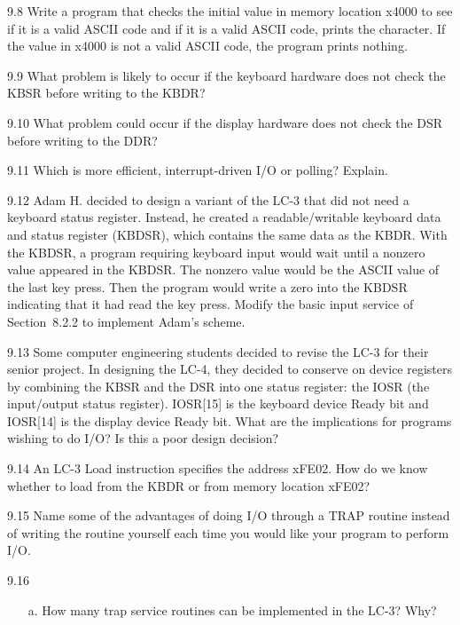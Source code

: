 \documentclass{patt}
\begin{document}
\begin{exercises}
\item[9.8] Write a program that checks the initial value in memory
  location x4000 to see if it is a valid ASCII code and if it is a
  valid ASCII code, prints the character. If the value in x4000 is not
  a valid ASCII code, the program prints nothing.

\item[9.9] What problem is likely to occur if the keyboard hardware
  does not check the KBSR before writing to the KBDR?

\item[9.10] What problem could occur if the display hardware does not
  check the DSR before writing to the DDR?

\item[9.11] Which is more efficient, interrupt-driven I/O or polling?
  Explain.

\item[9.12] Adam H. decided to design a variant of the LC-3 that did
  not need a keyboard status register.  Instead, he created a
  readable/writable keyboard data and status register (KBDSR), which
  contains the same data as the KBDR.  With the KBDSR, a program
  requiring keyboard input would wait until a nonzero value appeared
  in the KBDSR. The nonzero value would be the ASCII value of the last
  key press.  Then the program would write a zero into the KBDSR
  indicating that it had read the key press.  Modify the basic input
  service of Section~8.2.2 to implement Adam's scheme.

\item[9.13] Some computer engineering students decided to revise the
  LC-3 for their senior project. In designing the LC-4, they decided
  to conserve on device registers by combining the KBSR and the DSR
  into one status register: the IOSR (the input/output status
  register). IOSR[15] is the keyboard device Ready bit and IOSR[14] is
  the display device Ready bit. What are the implications for programs
  wishing to do I/O? Is this a poor design decision?


\item[9.14] An LC-3 Load instruction specifies the address xFE02. How
  do we know whether to load from the KBDR or from memory location
  xFE02?


\item[9.15] Name some of the advantages of doing I/O through a TRAP routine instead of
writing the routine yourself each time you would like your program to perform I/O.

\item[9.16]
\begin{enumerate}[a.]
\item[a.] How many  trap service routines can be implemented in the LC-3? Why?


\end{enumerate}
\end{exercises}
\end{document}
